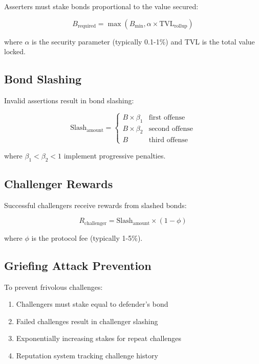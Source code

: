\documentclass[11pt,a4paper]{article}
\theoremstyle{definition}
\begin{document}
Asserters must stake bonds proportional to the value secured:

\begin{equation}
B_{\text{required}} = \max(B_{\text{min}}, \alpha \times \text{TVL}_{\text{rollup}})
\end{equation}

where $\alpha$ is the security parameter (typically 0.1-1\%) and TVL is the total value locked.

\subsection{Bond Slashing}

Invalid assertions result in bond slashing:

\begin{equation}
\text{Slash}_{\text{amount}} = \begin{cases}
B \times \beta_1 & \text{first offense} \\
B \times \beta_2 & \text{second offense} \\
B & \text{third offense}
\end{cases}
\end{equation}

where $\beta_1 < \beta_2 < 1$ implement progressive penalties.

\subsection{Challenger Rewards}

Successful challengers receive rewards from slashed bonds:

\begin{equation}
R_{\text{challenger}} = \text{Slash}_{\text{amount}} \times (1 - \phi)
\end{equation}

where $\phi$ is the protocol fee (typically 1-5\%).

\subsection{Griefing Attack Prevention}

To prevent frivolous challenges:

\begin{enumerate}
    \item Challengers must stake equal to defender's bond
    \item Failed challenges result in challenger slashing
    \item Exponentially increasing stakes for repeat challenges
    \item Reputation system tracking challenge history
\end{enumerate}
\end{document}
